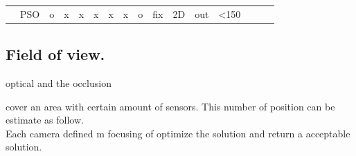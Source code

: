 \begin{landscape}
\begin{table}[]
\begin{tabular}{@{}  l|p{1.6cm} p{1.7cm} l  l p{0.659cm} p{0.612cm}p{.659cm} p{1.11cm} p{1.5cm} p{1.57cm}p{0.9cm}p{1.6cm}p{1.3cm}p{1.2cm} p{1.2cm}@{}}
\multicolumn{1}{l|}{\cellcolor[HTML]{FFFFFF}\cite{194*fu2010}} & PSO                                                                                                            & o                                                                     & x                                              & x                                              & x                                              & x                                                & x                                                 & o                                                 & fix                                                       & 2D                                                                                                              & out                                                          & \textless150                                                                                              &                                                                                                                             &                               &                                 
\end{tabular}
\end{table}
\end{landscape}


\subsection{Field of view.}

 optical and the occlusion

cover an area with certain amount of sensors. This number of position can be estimate as follow.\\   
Each camera defined m focusing of optimize the solution and return a acceptable solution.
 


